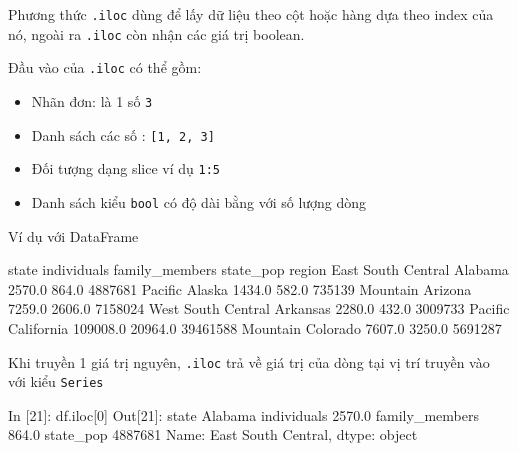 \documentclass[
]{book}
\newenvironment{Shaded}{\begin{snugshade}}{\end{snugshade}}
\newcommand{\BuiltInTok}[1]{#1}
\newcommand{\DecValTok}[1]{\textcolor[rgb]{0.00,0.00,0.81}{#1}}
\newcommand{\FloatTok}[1]{\textcolor[rgb]{0.00,0.00,0.81}{#1}}
\newcommand{\NormalTok}[1]{#1}
\begin{document}
Phương thức \texttt{.iloc} dùng để lấy dữ liệu theo cột hoặc hàng dựa theo index của nó, ngoài ra \texttt{.iloc} còn nhận các giá trị boolean.

Đầu vào của \texttt{.iloc} có thể gồm:

\begin{itemize}
\item
  Nhãn đơn: là 1 số \texttt{3}
\item
  Danh sách các số : \texttt{{[}1,\ 2,\ 3{]}}
\item
  Đối tượng dạng slice ví dụ \texttt{1:5}
\item
  Danh sách kiểu \texttt{bool} có độ dài bằng với số lượng dòng
\end{itemize}

Ví dụ với DataFrame

\begin{Shaded}
\begin{Highlighting}[]
\NormalTok{                         state  individuals  family\_members  state\_pop}
\NormalTok{region                                                                }
\NormalTok{East South Central     Alabama       }\FloatTok{2570.0}           \FloatTok{864.0}    \DecValTok{4887681}
\NormalTok{Pacific                 Alaska       }\FloatTok{1434.0}           \FloatTok{582.0}     \DecValTok{735139}
\NormalTok{Mountain               Arizona       }\FloatTok{7259.0}          \FloatTok{2606.0}    \DecValTok{7158024}
\NormalTok{West South Central    Arkansas       }\FloatTok{2280.0}           \FloatTok{432.0}    \DecValTok{3009733}
\NormalTok{Pacific             California     }\FloatTok{109008.0}         \FloatTok{20964.0}   \DecValTok{39461588}
\NormalTok{Mountain              Colorado       }\FloatTok{7607.0}          \FloatTok{3250.0}    \DecValTok{5691287}
\end{Highlighting}
\end{Shaded}

Khi truyền 1 giá trị nguyên, \texttt{.iloc} trả về giá trị của dòng tại vị trí truyền vào với kiểu \texttt{Series}

\begin{Shaded}
\begin{Highlighting}[]
\NormalTok{In [}\DecValTok{21}\NormalTok{]: df.iloc[}\DecValTok{0}\NormalTok{]}
\NormalTok{Out[}\DecValTok{21}\NormalTok{]:}
\NormalTok{state             Alabama}
\NormalTok{individuals        }\FloatTok{2570.0}
\NormalTok{family\_members      }\FloatTok{864.0}
\NormalTok{state\_pop         }\DecValTok{4887681}
\NormalTok{Name: East South Central, dtype: }\BuiltInTok{object}
\end{Highlighting}
\end{Shaded}
\end{document}

